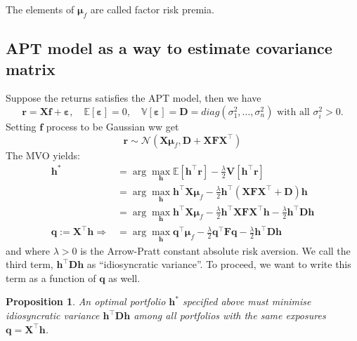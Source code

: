 \documentclass[13pt]{article}
\newtheorem{proposition}[theorem]{Proposition}
\theoremstyle{definition}
\theoremstyle{remark}
\newenvironment{remark}
  {\pushQED{\qed}\renewcommand{\qedsymbol}{$\triangle$}\remarkx}
  {\popQED\endremarkx}
\newcommand{\EE}{\mathbb{E}}
\newcommand{\VV}{\mathbb{\mathbf{V}}}
\begin{document}
\begin{remark}
The elements of $\boldsymbol{\mu}_f$ are called factor risk premia. 
\end{remark}

\subsection{APT model as a way to estimate covariance matrix}
Suppose the returns satisfies the APT model, then we have
$$
\bm{r}=\mathbf{X} \bm{f}+\bm{\varepsilon}, \quad \mathbb{E}[\bm{\varepsilon}]=0, \quad \mathbb{V}[\bm{\varepsilon}]=\mathbf{D}=diag\left(\sigma_1^2, \ldots, \sigma_n^2\right) \text{ with all }\sigma_i^2>0.$$
Setting $\bm{f}$ process to be Gaussian ww get $$\bm{r}\sim\mathcal{N}\left(\mathbf{X} \boldsymbol{\mu}_f, \mathbf{D}+\mathbf{X} \mathbf{F} \mathbf{X}^{\top}\right)
$$
The MVO yields:
\begin{align*}
\bm{h}^* &= \arg \max_{\bm{h}}\EE[\bm{h}^{\top}\bm{r}]-\frac{\lambda}{2}\VV[\bm{h}^\top\bm{r}]\\
&=\arg \max_{\bm{h}}\bm{h}^{\top}\mathbf{X} \boldsymbol{\mu}_f-\frac{\lambda}{2} \bm{h}^{\top}( \mathbf{X} \mathbf{F} \mathbf{X}^{\top} +\mathbf{D})\bm{h}\\
&=\arg \max_{\bm{h}}\bm{h}^{\top}\mathbf{X} \boldsymbol{\mu}_f-\frac{\lambda}{2} \bm{h}^{\top} \mathbf{X} \mathbf{F} \mathbf{X}^{\top} \bm{h}-\frac{\lambda}{2} \bm{h}^{\top} \mathbf{D} \bm{h}\\
\bm{q}:=\mathbf{X}^{\top} \bm{h}\Longrightarrow
&=\arg \max_{\bm{h}}\bm{q}^{\top} \boldsymbol{\mu}_f-\frac{\lambda}{2} \bm{q}^{\top} \mathbf{F} \bm{q}-\frac{\lambda}{2}  \bm{h}^{\top} \mathbf{D} \bm{h}
\end{align*}
and where $\lambda>0$ is the Arrow-Pratt constant absolute risk aversion. We call the third term, $\bm{h}^{\top} \mathbf{D} \bm{h}$ as  ``idiosyncratic variance''. To proceed, we want to write this term as a function of $\bm{q}$ as well.
\begin{proposition}\label{prop:APT numerical}
    An optimal portfolio $\bm{h}^*$ specified above must minimise idiosyncratic variance $\bm{h}^{\top} \mathbf{D} \bm{h}$ among all portfolios with the same exposures $\bm{q}=\mathbf{X}^{\top} \bm{h}$.
\end{proposition}
\end{document}
